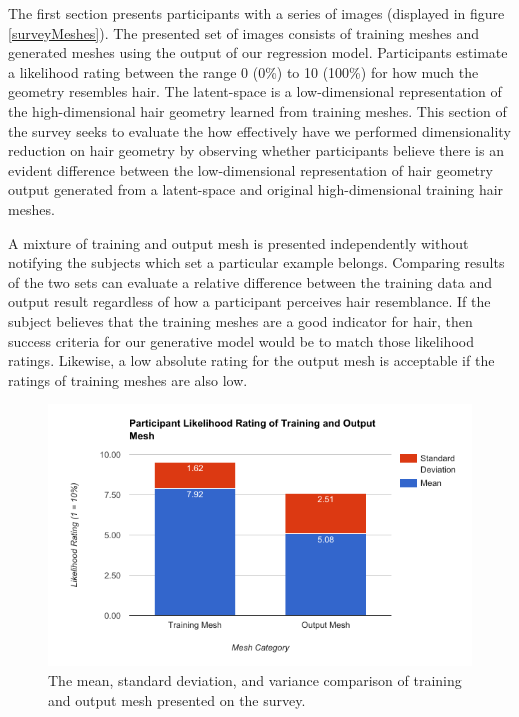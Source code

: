 \documentclass[ %
author={Dillon Keith Diep},
supervisor={Dr. Carl Henrik Ek},
degree={MEng},
title={ART-CG Hair:},
subtitle={Assisted Real-time Content Generation of Stylised Virtual Hair},
type={Research},
year={2017} ]{dissertation}
\begin{document}
The first section presents participants with a series of images (displayed in figure \ref{surveyMeshes}). The presented set of images consists of training meshes and generated meshes using the output of our regression model. Participants estimate a likelihood rating between the range 0 (0\%) to 10 (100\%) for how much the geometry resembles hair. 
The latent-space is a low-dimensional representation of the high-dimensional hair geometry learned from training meshes. This section of the survey seeks to evaluate the how effectively have we performed dimensionality reduction on hair geometry by observing whether participants believe there is an evident difference between the low-dimensional representation of hair geometry output generated from a latent-space and original high-dimensional training hair meshes. 

A mixture of training and output mesh is presented independently without notifying the subjects which set a particular example belongs. Comparing results of the two sets can evaluate a relative difference between the training data and output result regardless of how a participant perceives hair resemblance. If the subject believes that the training meshes are a good indicator for hair, then success criteria for our generative model would be to match those likelihood ratings. Likewise, a low absolute rating for the output mesh is acceptable if the ratings of training meshes are also low.

\begin{figure}[!h]
	\centering
	\includegraphics[scale=0.6]{images/meshRating}
	\caption{The mean, standard deviation, and variance comparison of training and output mesh presented on the survey.}
\end{figure}
\end{document}
